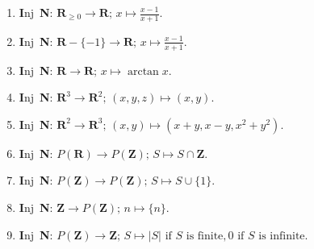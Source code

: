\documentclass[12pt, reqno]{amsart}
\begin{document}
\begin{enumerate}
\begin{enumerate}
  \item \textbf{I}nj\,  \textbf{N}:
    \hspace{12pt}
$\mathbf{R}_{\geq 0} \to \mathbf{R};\, x \mapsto \frac{x-1}{x+1}$.
\vspace{22pt}


  \item \textbf{I}nj\,  \textbf{N}:
    \hspace{12pt}
$\mathbf{R}-\{-1\} \to \mathbf{R};\, x \mapsto \frac{x-1}{x+1}$.
\vspace{22pt}




  \item \textbf{I}nj\,  \textbf{N}:
    \hspace{12pt}
$\mathbf{R} \to \mathbf{R};\, x \mapsto \arctan{x}$.
\vspace{22pt}


  \item \textbf{I}nj\,  \textbf{N}:
    \hspace{12pt}
$\mathbf{R}^3 \to \mathbf{R}^2;\, (x,y,z)\mapsto (x,y)$.
\vspace{22pt}

  \item \textbf{I}nj\,  \textbf{N}:
    \hspace{12pt}
$\mathbf{R}^2 \to \mathbf{R}^3;\, (x,y)\mapsto (x+y,x-y,x^2 + y^2)$.
\vspace{22pt}




  \item \textbf{I}nj\,  \textbf{N}:
    \hspace{12pt}
$P(\mathbf{R}) \to P(\mathbf{Z});\, S \mapsto S \cap \mathbf{Z}$.
\vspace{22pt}

  \item \textbf{I}nj\,  \textbf{N}:
    \hspace{12pt}
$P(\mathbf{Z}) \to P(\mathbf{Z});\, S \mapsto S \cup \{1\}$.
\vspace{22pt}


  \item \textbf{I}nj\,  \textbf{N}:
    \hspace{12pt}
$\mathbf{Z} \to P(\mathbf{Z});\, n \mapsto \{n\}$.
\vspace{22pt}

  \item \textbf{I}nj\,  \textbf{N}:
    \hspace{12pt}
$P(\mathbf{Z}) \to \mathbf{Z};\, S \mapsto |S| \text{ if } S \text{ is finite}, 0
\text{ if } S \text{ is infinite}$.
\vspace{22pt}


\end{enumerate}
\end{enumerate}
\end{document}
